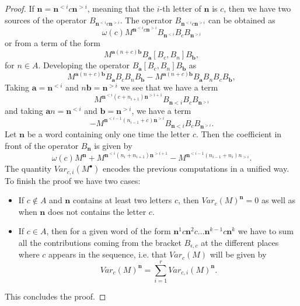 \documentclass[english,11pt]{amsart}
\def\nn{\mathbf{n}}
\def\aa{\mathbf{a}}
\def\bb{\mathbf{b}}
\def\di{\displaystyle}
\def\nn{\mathbf{n}}
\begin{document}
\begin{proof}
If $\nn =\nn^{< i} c \nn^{>i}$, meaning that the $i$-th letter of $\nn$ is $c$, then we have two sources of the operator $B_{\nn^{< i} c\nn^{>i}}$. The operator $B_{\nn^{< i} c\nn^{>i}}$ can be obtained as 
\begin{equation}
   \omega (c) M^{\nn^{< i} c\nn^{>i}} B_{\nn^{< i}} B_c B_{\nn^{>i}}
\end{equation}
or from a term of the form
\begin{equation}
M^{\aa (n+c) \bb} B_{\aa} [B_c ,B_n ] B_{\bb} ,
\end{equation}
for $n\in A$. Developing the operator $B_{\aa} [B_c ,B_n] B_{\bb}$ as   
\begin{equation}
M^{\aa (n+c) \bb} B_{\aa} B_c B_n B_{\bb} - M^{\aa (n+c) \bb} B_{\aa} B_n B_c  B_{\bb},
\end{equation}
Taking $\aa =\nn^{<i}$ and $n \bb =\nn^{>i}$ we see that we have a term
\begin{equation}
  M^{\nn^{<i} (c+n_{i+1}) \nn^{>i+1}} B_{\nn <i} B_c B_{\nn^{>i}}
\end{equation}
and taking $\aa n =\nn^{<i}$ and $\bb=\nn^{>i}$, we have a term 
\begin{equation}
-  M^{\nn^{<i-1} (n_{i-1} +c) \nn^{>i}} B_{\nn <i} B_c B_{\nn^{>i}}
.
\end{equation}
Let $\nn$ be a word containing only one time the letter $c$. Then the coefficient in front of the operator $B_{\nn}$ is given by 
\begin{equation}
    \omega (c) M^{\nn} +M^{\nn^{<i} (n_i+n_{i+1}) \nn^{>i+1}} -M^{\nn^{<i-1} (n_{i-1} +n_i) n_{>i}}  
     .
\end{equation}
The quantity $Var_{c,i} (M^{\bullet} )$ encodes the previous computations in a unified way.\\

To finish the proof we have two cases:\\

\begin{itemize}
\item If $c\not\in A$ and $\nn$ contains at least two letters $c$, then $Var_c (M)^{\nn} =0$ as well as when $\nn$ does not contains the letter $c$. 

\item If $c\in A$, then for a given word of the form $\nn^1 c \nn^2 c\dots \nn^{k-1} c \nn^k$ we have to sum all the contributions coming from the bracket $B_{\epsilon ,c}$ at the different places where $c$ appears in the sequence, i.e. that $Var_c (M)$ will be given by
\begin{equation}
    Var_c (M)^{\nn} =\di\sum_{i=1}^r Var_{c,i} (M)^{\nn} .
\end{equation}
\end{itemize}
This concludes the proof.
\end{proof}
\end{document}
